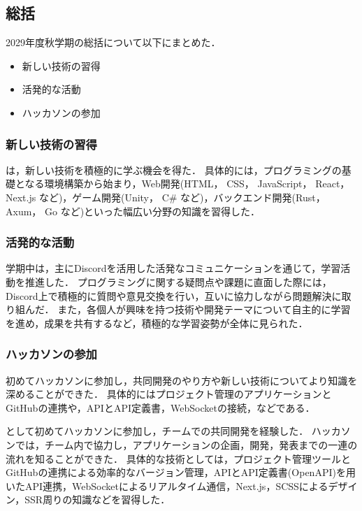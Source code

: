 \subsection*{\firstGrade{}総括}


2029年度秋学期の\firstGrade{}総括について以下にまとめた．

\begin{itemize}
	\item 新しい技術の習得
	\item 活発的な活動
	\item ハッカソンの参加
\end{itemize}

\subsubsection*{新しい技術の習得}

\firstGrade{}は，新しい技術を積極的に学ぶ機会を得た．
具体的には，プログラミングの基礎となる環境構築から始まり，Web開発(HTML， CSS， JavaScript， React， Next.js など)，ゲーム開発(Unity， C\# など)，バックエンド開発(Rust， Axum， Go など)といった幅広い分野の知識を習得した．

\subsubsection*{活発的な活動}

学期中は，主にDiscordを活用した活発なコミュニケーションを通じて，学習活動を推進した．
プログラミングに関する疑問点や課題に直面した際には，Discord上で積極的に質問や意見交換を行い，互いに協力しながら問題解決に取り組んだ．
また，各個人が興味を持つ技術や開発テーマについて自主的に学習を進め，成果を共有するなど，積極的な学習姿勢が全体に見られた．

\subsubsection*{ハッカソンの参加}
初めてハッカソンに参加し，共同開発のやり方や新しい技術についてより知識を深めることができた．
具体的にはプロジェクト管理のアプリケーションとGitHubの連携や，APIとAPI定義書，WebSocketの接続，などである．

\firstGrade{}として初めてハッカソンに参加し，チームでの共同開発を経験した．
ハッカソンでは，チーム内で協力し，アプリケーションの企画，開発，発表までの一連の流れを知ることができた．
具体的な技術としては，プロジェクト管理ツールとGitHubの連携による効率的なバージョン管理，APIとAPI定義書(OpenAPI)を用いたAPI連携，WebSocketによるリアルタイム通信，Next.js，SCSSによるデザイン，SSR周りの知識などを習得した．
